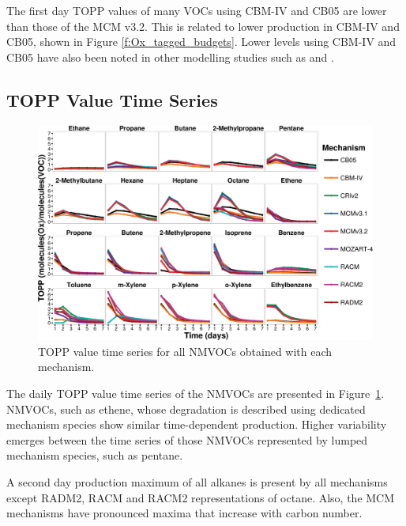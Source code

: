 The first day TOPP values of many VOCs using CBM-IV and CB05 are lower than those of the MCM v3.2. 
This is related to lower  production in CBM-IV and CB05, shown in Figure \ref{f:Ox_tagged_budgets}.
Lower  levels using CBM-IV and CB05 have also been noted in other modelling studies such as \citet{Luecken:2008, Emmerson:2009} and \citet{Saylor:2012}.

\subsection{TOPP Value Time Series} \label{ss:profiles} %

\begin{figure}
    \centering
    \includegraphics[width=\textwidth]{img/TOPP_daily_values_all_species}
    \vspace{0mm}
    \caption{TOPP value time series for all NMVOCs obtained with each mechanism.}
    \vspace{-4mm}
    \label{f:TOPP_dailies}
\end{figure}

The daily TOPP value time series of the NMVOCs are presented in \mbox{Figure \ref{f:TOPP_dailies}}. 
NMVOCs, such as ethene, whose degradation is described using dedicated mechanism species show similar time-dependent  production.
Higher variability emerges between the time series of those NMVOCs represented by lumped mechanism species, such as pentane.

A second day  production maximum of all alkanes is present by all mechanisms except RADM2, RACM and RACM2 representations of octane. 
Also, the MCM mechanisms have pronounced maxima that increase with carbon number.

